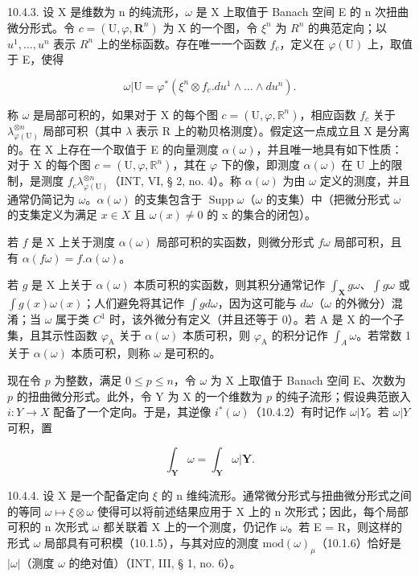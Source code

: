 10.4.3. 设 X 是维数为 n 的纯流形，\(\omega\) 是 X 上取值于 Banach 空间 E 的 n 次扭曲微分形式。令 \(c = (\mathrm{U}, \varphi, \mathbf{R}^{n})\) 为 X 的一个图，令 \(\xi^{n}\) 为 \(R^{n}\) 的典范定向；以 \(u^{1}, \ldots, u^{n}\) 表示 \(R^{n}\) 上的坐标函数。存在唯一一个函数 \(f_{c}\)，定义在 \(\varphi(\mathrm{U})\) 上，取值于 E，使得

\[
\omega | \mathrm{U} = \varphi^ {*} (\xi^ {n} \otimes f _ {c}. d u ^ {1} \wedge \dots \wedge d u ^ {n}).
\]

称 \(\omega\) 是局部可积的，如果对于 X 的每个图 \(c = (\mathrm{U},\varphi ,\mathbb{R}^n)\)，相应函数 \(f_{c}\) 关于 \(\lambda_{\varphi (\mathrm{U})}^{\otimes n}\) 局部可积（其中 \(\lambda\) 表示 R 上的勒贝格测度）。假定这一点成立且 X 是分离的。在 X 上存在一个取值于 E 的向量测度 \(\alpha (\omega)\)，并且唯一地具有如下性质：对于 X 的每个图 \(c = (\mathrm{U},\varphi ,\mathbb{R}^n)\)，其在 \(\varphi\) 下的像，即测度 \(\alpha (\omega)\) 在 U 上的限制，是测度 \(f_{c}\lambda_{\varphi(\mathrm{U})}^{\otimes n}\)（INT, VI, § 2, no. 4）。称 \(\alpha (\omega)\) 为由 \(\omega\) 定义的测度，并且通常仍简记为 \(\omega\)。\(\alpha (\omega)\) 的支集包含于 \(\operatorname{Supp}\omega\)（\(\omega\) 的支集）中（把微分形式 \(\omega\) 的支集定义为满足 \(x\in X\) 且 \(\omega (x)\neq 0\) 的 x 的集合的闭包）。

若 \(f\) 是 X 上关于测度 \(\alpha(\omega)\) 局部可积的实函数，则微分形式 \(f\omega\) 局部可积，且有 \(\alpha(f\omega) = f.\alpha(\omega)\)。

若 \(g\) 是 X 上关于 \(\alpha(\omega)\) 本质可积的实函数，则其积分通常记作 \(\int_{\mathbf{X}} g\omega\)、\(\int g\omega\) 或 \(\int g(x)\omega(x)\)；人们避免将其记作 \(\int g d\omega\)，因为这可能与 \(d\omega\)（\(\omega\) 的外微分）混淆；当 \(\omega\) 属于类 \(C^{1}\) 时，该外微分有定义（并且还等于 0）。若 A 是 X 的一个子集，且其示性函数 \(\varphi_{\mathrm{A}}\) 关于 \(\alpha(\omega)\) 本质可积，则 \(\varphi_{\mathrm{A}}\) 的积分记作 \(\int_{A} \omega\)。若常数 1 关于 \(\alpha(\omega)\) 本质可积，则称 \(\omega\) 是可积的。

现在令 \(p\) 为整数，满足 \(0 \leqslant p \leqslant n\)，令 \(\omega\) 为 X 上取值于 Banach 空间 E、次数为 \(p\) 的扭曲微分形式。此外，令 Y 为 X 的一个维数为 \(p\) 的纯子流形；假设典范嵌入 \(i: Y \to X\) 配备了一个定向。于是，其逆像 \(i^{*}(\omega)\)（10.4.2）有时记作 \(\omega|Y\)。若 \(\omega|Y\) 可积，置

\[
\int_ {\mathbf {Y}} \omega = \int_ {\mathbf {Y}} \omega | \mathbf {Y}.
\]

10.4.4. 设 X 是一个配备定向 \(\xi\) 的 n 维纯流形。通常微分形式与扭曲微分形式之间的等同 \(\omega \mapsto \xi \otimes \omega\) 使得可以将前述结果应用于 X 上的 n 次形式；因此，每个局部可积的 n 次形式 \(\omega\) 都关联着 X 上的一个测度，仍记作 \(\omega\)。若 E = R，则这样的形式 \(\omega\) 局部具有可积模（10.1.5），与其对应的测度 \(\text{mod}(\omega)_{\mu}\)（10.1.6）恰好是 \(|\omega|\)（测度 \(\omega\) 的绝对值）（INT, III, § 1, no. 6）。

